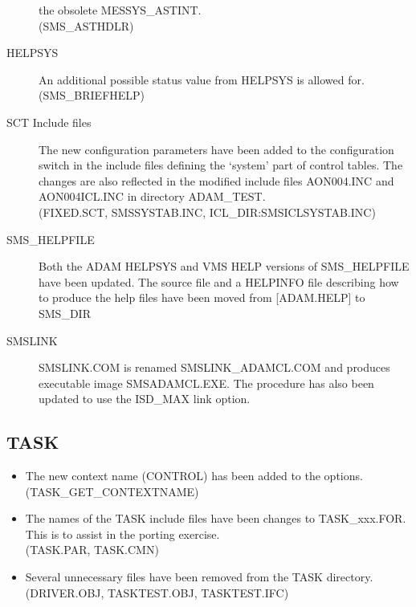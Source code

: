 \begin{description}
the obsolete MESSYS\_ASTINT.\\
(SMS\_ASTHDLR)
\item[HELPSYS] An additional possible status value from HELPSYS is allowed
for.\\
(SMS\_BRIEFHELP)
\item[SCT Include files] The new configuration parameters have been added to
the configuration switch in the include files defining the `system' part of
control tables.
The changes are also reflected in the modified include files
AON004.INC and AON004ICL.INC in directory ADAM\_TEST.\\
(FIXED.SCT, SMSSYSTAB.INC, ICL\_DIR:SMSICLSYSTAB.INC)
\item[SMS\_HELPFILE] Both the ADAM HELPSYS and VMS HELP versions of
SMS\_HELPFILE have been updated. The source file and a HELPINFO file describing
how to produce the help files have been moved from [ADAM.HELP] to SMS\_DIR
\item[SMSLINK] SMSLINK.COM is renamed SMSLINK\_ADAMCL.COM and produces
executable image SMSADAMCL.EXE.
The procedure has also been updated to use the ISD\_MAX link option.
\end{description}

\subsection{TASK}
\begin{itemize}
\item The new context name (CONTROL) has been added to the options.\\
(TASK\_GET\_CONTEXTNAME)
\item The names of the TASK include files have been changes to TASK\_xxx.FOR.
This is to assist in the porting exercise.\\
(TASK.PAR, TASK.CMN)
\item Several unnecessary files have been removed from the TASK directory.\\
(DRIVER.OBJ, TASKTEST.OBJ, TASKTEST.IFC)
\end{itemize}

